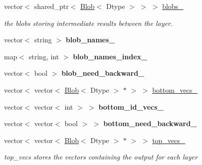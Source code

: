 \begin{DoxyCompactItemize}
vector$<$ shared\+\_\+ptr$<$ \mbox{\hyperlink{classcaffe_1_1_blob}{Blob}}$<$ Dtype $>$ $>$ $>$ \mbox{\hyperlink{classcaffe_1_1_net_af567603bdcbadf89cde413b9042640b9}{blobs\+\_\+}}
\begin{DoxyCompactList}\small\item\em the blobs storing intermediate results between the layer. \end{DoxyCompactList}\item 
\mbox{\label{classcaffe_1_1_net_a366809dc61f712030378d5e12129f900}} 
vector$<$ string $>$ {\bfseries blob\+\_\+names\+\_\+}
\item 
\mbox{\label{classcaffe_1_1_net_a6922802906a50145321ff8325678c4f9}} 
map$<$ string, int $>$ {\bfseries blob\+\_\+names\+\_\+index\+\_\+}
\item 
\mbox{\label{classcaffe_1_1_net_a97af59a53882317321a7e1bed5efc427}} 
vector$<$ bool $>$ {\bfseries blob\+\_\+need\+\_\+backward\+\_\+}
\item 
vector$<$ vector$<$ \mbox{\hyperlink{classcaffe_1_1_blob}{Blob}}$<$ Dtype $>$ $\ast$ $>$ $>$ \mbox{\hyperlink{classcaffe_1_1_net_a0fbce4484a2ead09eba35d8e2b18bb41}{bottom\+\_\+vecs\+\_\+}}
\item 
\mbox{\label{classcaffe_1_1_net_abcafd35a856fe5148f72b4ab05deee54}} 
vector$<$ vector$<$ int $>$ $>$ {\bfseries bottom\+\_\+id\+\_\+vecs\+\_\+}
\item 
\mbox{\label{classcaffe_1_1_net_a60466f78076207b4cd57635b5dfc2d6f}} 
vector$<$ vector$<$ bool $>$ $>$ {\bfseries bottom\+\_\+need\+\_\+backward\+\_\+}
\item 
\mbox{\label{classcaffe_1_1_net_af5a7616220a862fab571267532ee847e}} 
vector$<$ vector$<$ \mbox{\hyperlink{classcaffe_1_1_blob}{Blob}}$<$ Dtype $>$ $\ast$ $>$ $>$ \mbox{\hyperlink{classcaffe_1_1_net_af5a7616220a862fab571267532ee847e}{top\+\_\+vecs\+\_\+}}
\begin{DoxyCompactList}\small\item\em top\+\_\+vecs stores the vectors containing the output for each layer \end{DoxyCompactList}\item 
\mbox{\label{classcaffe_1_1_net_a239dfb2bc855ebcd3a47e58001b06c77}} 

\end{DoxyCompactItemize}
